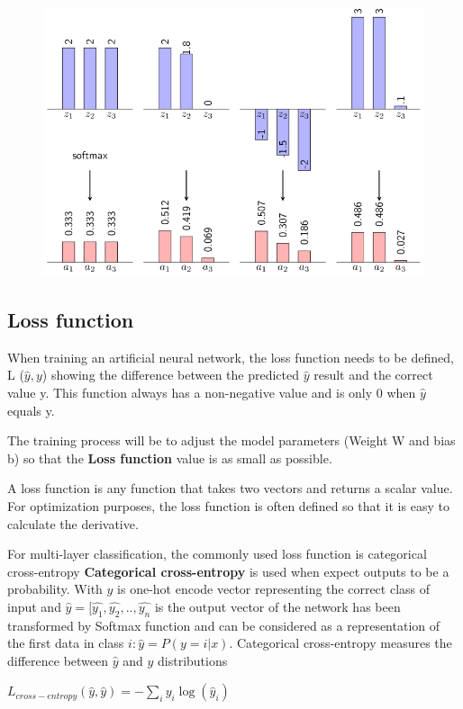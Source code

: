 \begin{center}
	\begin{figure}[H]
		\centering
		\includegraphics[width=0.75\columnwidth]{images/chap2/Softmax.png}
		\label{chap2:softmax}
	\end{figure}
\end{center}
\vspace{-1cm}
\subsection{Loss function}
When training an artificial neural network, the loss function needs to be defined, L ($\hat{y}, y$) showing the difference between the predicted $\hat{y}$ result and the correct value y. This function always has a non-negative value and is only 0 when $\hat{y}$ equals y.

The training process will be to adjust the model parameters (Weight W and bias b) so that the \textbf{Loss function} value is as small as possible.

A loss function is any function that takes two vectors and returns a scalar value. For optimization purposes, the loss function is often defined so that it is easy to calculate the derivative.

For multi-layer classification, the commonly used loss function is categorical cross-entropy
\textbf{Categorical cross-entropy} is used when expect outputs to be a probability.
With $y$ is one-hot encode vector representing the correct class of input and $\hat{y} = [\hat{y_1},\hat{y_2},..,\hat{y_n}$ is the output vector of the network has been transformed by Softmax function and can be considered as a representation of the first data in class $i: \hat{y} = P(y = i|x)$. Categorical cross-entropy measures the difference between $\hat{y}$ and $y$ distributions
\begin{center}
	$L_{cross-entropy}(\hat{y},\hat{y}) = - \sum\limits_{i}y_{i}\log(\hat{y}_{i})$
\end{center}
